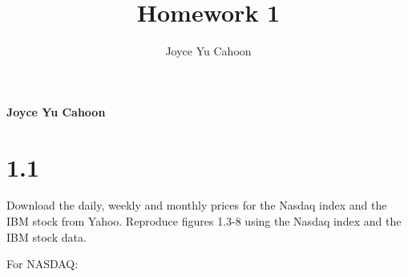 \documentclass[11pt,]{article}
\title{Homework 1  }
\author{\Large Joyce Yu Cahoon\vspace{0.05in} \newline\normalsize\emph{}  }
\date{}
\newcommand*{\authorfont}{\fontfamily{phv}\selectfont}
\begin{document}
%

{%
\setlength{\parindent}{0pt}
\thispagestyle{plain}
{\fontsize{18}{20}\selectfont\raggedright 
\maketitle  %

}

{
  \vskip 13.5pt\relax \normalsize\fontsize{11}{12} 
  \textbf{\authorfont Joyce Yu Cahoon} \hskip 15pt \emph{\small }   
  
}

}






\vskip 6.5pt


\noindent  \hypertarget{section}{%
\section{1.1}\label{section}}

Download the daily, weekly and monthly prices for the Nasdaq index and
the IBM stock from Yahoo. Reproduce figures 1.3-8 using the Nasdaq index
and the IBM stock data.

For NASDAQ:
\end{document}
